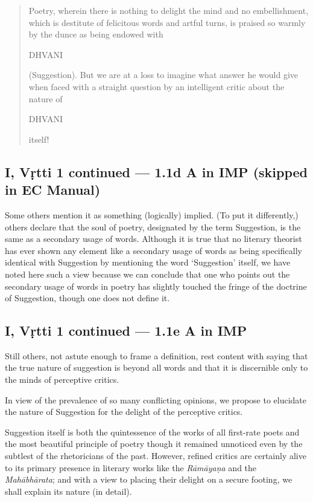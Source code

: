 \documentclass[12pt]{book}
\begin{document}
\begin{quotation}
\begin{em}
Poetry, wherein there is nothing to delight the mind and no
embellishment, which is destitute of felicitous words and
artful turns, is praised so warmly by the dunce as being
endowed with 
\end{em}
DHVANI
\begin{em}
(Suggestion). But we are at a loss to
imagine what answer he would give when faced with
a straight question by an intelligent critic about the nature of
\end{em}
DHVANI
\begin{em}
itself!
\end{em}
\end{quotation}


\subsection{I, Vṛtti 1 continued --- 1.1d A in IMP (skipped in EC Manual)}

Some others mention it as something (logically) implied.
(To put it differently,) others declare that the soul of poetry,
designated by the term Suggestion, is the same as a secondary
usage of words. Although it is true that no literary theorist has
ever shown any element like a secondary usage of words as being
specifically identical with Suggestion by mentioning the word
`Suggestion' itself, we have noted here such a view because we
can conclude that one who points out the secondary usage of
words in poetry has slightly touched the fringe of the doctrine
of Suggestion, though one does not define it.


\subsection{I, Vṛtti 1 continued --- 1.1e A in IMP}

Still others, not astute enough to frame a definition, rest
content with saying that the true nature of suggestion is beyond
all words and that it is discernible only to the minds of
perceptive critics.

In view of the prevalence of so many conflicting opinions,
we propose to elucidate the nature of Suggestion for the delight
of the perceptive critics.

Suggestion itself is both the quintessence of the works of all
first-rate poets and the most beautiful principle of poetry though it
remained unnoticed even by the subtlest of the rhetoricians
of the past. However, refined critics are certainly alive to its
primary presence in literary works like the \textit{Rāmāyaṇa} and the
\textit{Mahābhārata}; and with a view to placing their delight on a
secure footing, we shall explain its nature (in detail).
\end{document}
